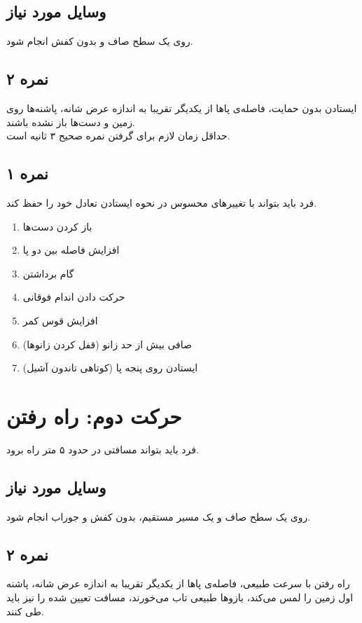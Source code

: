 \documentclass[12pt]{report}
\begin{document}
	\subsection*{وسایل مورد نیاز}
	 روی یک سطح صاف و بدون کفش انجام شود.
	\subsection*{نمره ۲}
	ایستادن بدون حمایت، فاصله‌ی پاها از یکدیگر تقریبا به اندازه عرض شانه، پاشنه‌ها روی زمین و دست‌ها باز نشده باشند. 
	\\
	حداقل زمان لازم برای گرفتن نمره صحیح ۳ ثانیه است.
	\subsection*{نمره ۱}
	فرد باید بتواند با تغییر‌های محسوس در نحوه ایستادن تعادل خود را حفظ کند.
	\begin{enumerate}
		\item باز کردن دست‌ها
		\item افزایش فاصله بین دو پا
		\item گام برداشتن
		\item حرکت دادن اندام فوقانی
		\item افزایش قوس کمر
		\item صافی بیش از حد زانو (قفل کردن زانوها)
		\item ایستادن روی پنجه پا (کوتاهی تاندون آشیل)
	\end{enumerate}
	\newpage
	
	\section*{حرکت دوم: راه رفتن}
فرد باید بتواند مسافتی در حدود ۵ متر راه برود.
	\subsection*{وسایل مورد نیاز}
	روی یک سطح صاف و یک مسیر مستقیم، بدون کفش و جوراب انجام شود.
	\subsection*{نمره ۲}
	راه رفتن با سرعت طبیعی، فاصله‌ی پاها از یکدیگر تقریبا به اندازه عرض شانه، پاشنه اول زمین را لمس می‌کند، بازوها طبیعی تاب می‌خورند، مسافت تعیین شده را نیز باید طی کنند.
\end{document}
